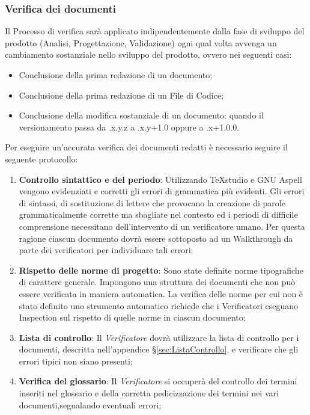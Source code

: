 {	\subsubsection{Verifica dei documenti}
	\label{sec:VerificaDocumenti}
	Il Processo di verifica sarà applicato indipendentemente dalla fase di sviluppo del prodotto (Analisi, Progettazione, Validazione) ogni qual volta avvenga un cambiamento sostanziale nello sviluppo del prodotto, ovvero nei seguenti casi:
		\begin{itemize}
			\item Conclusione della prima redazione di un documento;
			\item Conclusione della prima redazione di un File\ped{g} di Codice;
			\item Conclusione della modifica sostanziale di un documento: quando il versionamento passa da .x.y.z a .x.y+1.0 oppure a .x+1.0.0.
		\end{itemize}
	Per eseguire un'accurata verifica dei documenti redatti è necessario seguire il seguente protocollo:
	\begin{enumerate}
	\item \textbf{Controllo sintattico e del periodo}: Utilizzando TeXstudio e GNU Aspell vengono evidenziati e corretti gli errori di grammatica più evidenti. Gli errori di sintassi, di sostituzione di lettere che provocano la creazione di parole grammaticalmente corrette ma sbagliate nel contesto ed i periodi di difficile comprensione necessitano dell’intervento di un verificatore umano. Per questa ragione ciascun documento dovrà essere sottoposto ad un Walkthrough da parte dei verificatori per individuare tali errori;
	\item \textbf{Rispetto delle norme di progetto}: Sono state definite norme tipografiche di carattere generale. Impongono una struttura dei documenti che non può essere verificata in maniera automatica. La verifica delle norme
	per cui non è stato definito uno strumento automatico richiede che i Verificatori eseguano Inspection sul rispetto di quelle norme in ciascun documento;
	\item \textbf{Lista di controllo}: Il \emph{Verificatore} dovrà utilizzare la lista di controllo per i documenti, descritta nell’appendice \S\ref{sec:ListaControllo}, e verificare che gli errori tipici non siano	presenti;
	\item \textbf{Verifica del glossario}: Il \emph{Verificatore} si occuperà del controllo dei termini inseriti nel glossario e della corretta pedicizzazione dei termini nei vari documenti,segnalando eventuali errori;

\end{enumerate}}
